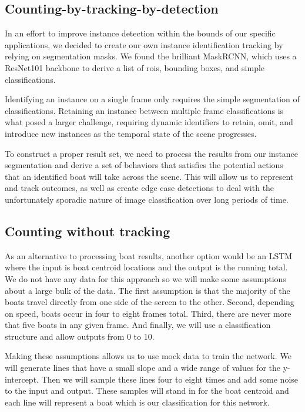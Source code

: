 \documentclass[10pt,twocolumn,letterpaper]{article}
\begin{document}
\subsection{Counting-by-tracking-by-detection}

In an effort to improve instance detection within the bounds of our specific applications, we decided to create our own instance identification tracking by relying on segmentation masks.  We found the brilliant MaskRCNN, which uses a ResNet101 backbone to derive a list of rois, bounding boxes, and simple classifications.

Identifying an instance on a single frame only requires the simple  segmentation of classifications.  Retaining an instance between multiple frame classifications is what posed a larger challenge, requiring dynamic identifiers to retain, omit, and introduce new instances as the temporal state of the scene progresses.  

To construct a proper result set, we need to process the results from our instance segmentation and derive a set of behaviors that satisfies the potential actions that an identified boat will take across the scene.  This will allow us to represent and track outcomes, as well as create edge case detections to deal with the unfortunately sporadic nature of image classification over long periods of time.


\subsection{Counting without tracking}

As an alternative to processing boat results, another option would be an LSTM where the input is boat centroid locations and the output is the running total. We do not have any data for this approach so we will make some assumptions about a large bulk of the data. The first assumption is that the majority of the boats travel directly from one side of the screen to the other. Second, depending on speed, boats occur in four to eight frames total. Third, there are never more that five boats in any given frame. And finally, we will use a classification structure and allow outputs from 0 to 10. 

Making these assumptions allows us to use mock data to train the network. We will generate lines that have a small slope and a wide range of values for the y-intercept. Then we will sample these lines four to eight times and add some noise to the input and output. These samples will stand in for the boat centroid and each line will represent a boat which is our classification for this network.
\end{document}
